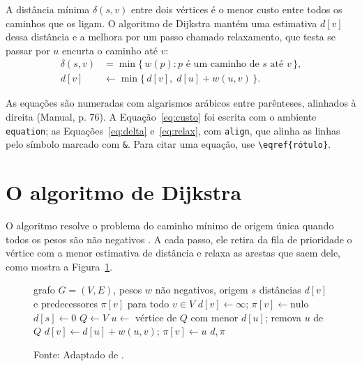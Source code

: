 \documentclass[eq,capa]{texufpel}
\begin{document}
A distância mínima $\delta(s, v)$ entre dois vértices é o menor custo entre
todos os caminhos que os ligam. O algoritmo de Dijkstra mantém uma estimativa
$d[v]$ dessa distância e a melhora por um passo chamado relaxamento, que
testa se passar por $u$ encurta o caminho até $v$:
\begin{align}
  \delta(s, v) &= \min \{\, w(p) : p \text{ é um caminho de } s \text{ até } v \,\},
  \label{eq:delta}\\
  d[v] &\leftarrow \min \{\, d[v],\; d[u] + w(u, v) \,\}.
  \label{eq:relax}
\end{align}

As equações são numeradas com algarismos arábicos entre parênteses, alinhados
à direita (Manual, p. 76). A Equação~\eqref{eq:custo} foi escrita com o
ambiente \texttt{equation}; as Equações~\eqref{eq:delta} e~\eqref{eq:relax},
com \texttt{align}, que alinha as linhas pelo símbolo marcado com \verb|&|.
Para citar uma equação, use \verb|\eqref{rótulo}|.

\section{O algoritmo de Dijkstra}
\label{sec:dijkstra}

O algoritmo resolve o problema do caminho mínimo de origem única quando todos
os pesos são não negativos \citep{Dijkstra:1959:NTP}. A cada passo, ele retira
da fila de prioridade o vértice com a menor estimativa de distância e relaxa
as arestas que saem dele, como mostra a Figura~\ref{fig:dijkstra}.

\begin{figure}[htbp]
  \caption{Pseudocódigo do algoritmo de Dijkstra}
  \label{fig:dijkstra}
  \begin{algorithmic}[1]
    \Require grafo $G = (V, E)$, pesos $w$ não negativos, origem $s$
    \Ensure distâncias $d[v]$ e predecessores $\pi[v]$ para todo $v \in V$
      \State $d[v] \gets \infty$; \quad $\pi[v] \gets \text{nulo}$
    \EndFor
    \State $d[s] \gets 0$
    \State $Q \gets V$ 
      \State $u \gets$ vértice de $Q$ com menor $d[u]$; remova $u$ de $Q$
          \State $d[v] \gets d[u] + w(u, v)$; \quad $\pi[v] \gets u$
        \EndIf
      \EndFor
    \EndWhile
    \State \Return $d, \pi$
  \end{algorithmic}
  \caption*{Fonte: Adaptado de \citet{Cormen:2022:IA}.}
\end{figure}
\end{document}
